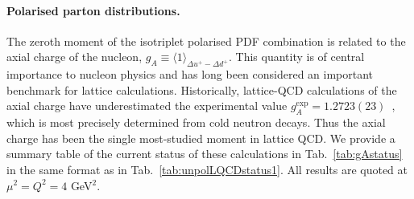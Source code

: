 \paragraph{Polarised parton distributions.}{
The zeroth moment of the isotriplet polarised PDF combination is related to the 
axial charge of the nucleon, $g_A\equiv \langle 1\rangle_{\Delta u^+-\Delta d^+}$.
%
This quantity is of central importance to nucleon physics and has long been 
considered an important benchmark for lattice calculations. 
%
Historically, lattice-QCD calculations of the axial charge have underestimated 
the experimental value $g_A^{\mathrm{exp}} = 1.2723(23)$~\cite{Olive:2016xmw}, 
which is most precisely determined from cold neutron decays. 
%
Thus the axial charge has been the single most-studied moment in lattice QCD.
%
We provide a summary table of the current status of these calculations in 
Tab.~\ref{tab:gAstatus} in the same format as in 
Tab.~\ref{tab:unpolLQCDstatus1}.
%
All results are quoted at $\mu^2=Q^2=4$ GeV$^2$.

}
